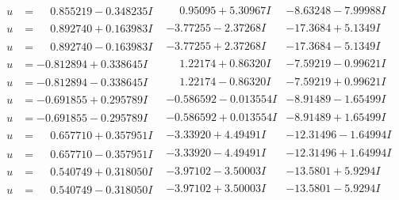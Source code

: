 \documentclass[1p]{elsarticle_modified}
\theoremstyle{definition}
\begin{document}
$$\begin{array}{c|c|c}
\begin{aligned}
u &= \phantom{-}0.855219 - 0.348235 I\end{aligned}
 & \phantom{-}0.95095 + 5.30967 I & -8.63248 - 7.99988 I \\ \hline\begin{aligned}
u &= \phantom{-}0.892740 + 0.163983 I\end{aligned}
 & -3.77255 - 2.37268 I & -17.3684 + 5.1349 I \\ \hline\begin{aligned}
u &= \phantom{-}0.892740 - 0.163983 I\end{aligned}
 & -3.77255 + 2.37268 I & -17.3684 - 5.1349 I \\ \hline\begin{aligned}
u &= -0.812894 + 0.338645 I\end{aligned}
 & \phantom{-}1.22174 + 0.86320 I & -7.59219 - 0.99621 I \\ \hline\begin{aligned}
u &= -0.812894 - 0.338645 I\end{aligned}
 & \phantom{-}1.22174 - 0.86320 I & -7.59219 + 0.99621 I \\ \hline\begin{aligned}
u &= -0.691855 + 0.295789 I\end{aligned}
 & -0.586592 - 0.013554 I & -8.91489 - 1.65499 I \\ \hline\begin{aligned}
u &= -0.691855 - 0.295789 I\end{aligned}
 & -0.586592 + 0.013554 I & -8.91489 + 1.65499 I \\ \hline\begin{aligned}
u &= \phantom{-}0.657710 + 0.357951 I\end{aligned}
 & -3.33920 + 4.49491 I & -12.31496 - 1.64994 I \\ \hline\begin{aligned}
u &= \phantom{-}0.657710 - 0.357951 I\end{aligned}
 & -3.33920 - 4.49491 I & -12.31496 + 1.64994 I \\ \hline\begin{aligned}
u &= \phantom{-}0.540749 + 0.318050 I\end{aligned}
 & -3.97102 - 3.50003 I & -13.5801 + 5.9294 I \\ \hline\begin{aligned}
u &= \phantom{-}0.540749 - 0.318050 I\end{aligned}
 & -3.97102 + 3.50003 I & -13.5801 - 5.9294 I \\ \hline\begin{aligned}

\end{aligned}
\end{array}$$
\end{document}
